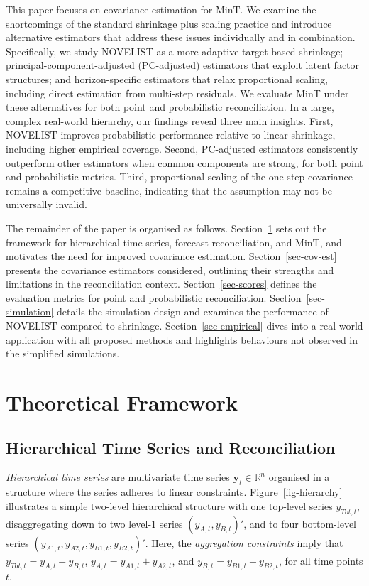 \documentclass[
  11pt,
  letterpaper,
  DIV=11,
  numbers=noendperiod,
  titlepage]{scrartcl}
\begin{document}
This paper focuses on covariance estimation for MinT. We examine the
shortcomings of the standard shrinkage plus scaling practice and
introduce alternative estimators that address these issues individually
and in combination. Specifically, we study NOVELIST as a more adaptive
target-based shrinkage; principal-component-adjusted (PC-adjusted)
estimators that exploit latent factor structures; and horizon-specific
estimators that relax proportional scaling, including direct estimation
from multi-step residuals. We evaluate MinT under these alternatives for
both point and probabilistic reconciliation. In a large, complex
real-world hierarchy, our findings reveal three main insights. First,
NOVELIST improves probabilistic performance relative to linear
shrinkage, including higher empirical coverage. Second, PC-adjusted
estimators consistently outperform other estimators when common
components are strong, for both point and probabilistic metrics. Third,
proportional scaling of the one-step covariance remains a competitive
baseline, indicating that the assumption may not be universally invalid.

The remainder of the paper is organised as follows.
Section~\ref{sec-pre-theory} sets out the framework for hierarchical
time series, forecast reconciliation, and MinT, and motivates the need
for improved covariance estimation. Section~\ref{sec-cov-est} presents
the covariance estimators considered, outlining their strengths and
limitations in the reconciliation context. Section~\ref{sec-scores}
defines the evaluation metrics for point and probabilistic
reconciliation. Section~\ref{sec-simulation} details the simulation
design and examines the performance of NOVELIST compared to shrinkage.
Section~\ref{sec-empirical} dives into a real-world application with all
proposed methods and highlights behaviours not observed in the
simplified simulations.

\section{Theoretical Framework}\label{sec-pre-theory}

\subsection{Hierarchical Time Series and
Reconciliation}\label{sec-hierarchy}

\emph{Hierarchical time series} are multivariate time series
\(\boldsymbol{y}_t \in \mathbb{R}^n\) organised in a structure where the
series adheres to linear constraints. Figure~\ref{fig-hierarchy}
illustrates a simple two-level hierarchical structure with one top-level
series \(y_{Tot,t}\), disaggregating down to two level-1 series
\((y_{A,t}, y_{B,t})'\), and to four bottom-level series
\((y_{A1,t}, y_{A2,t}, y_{B1,t}, y_{B2,t})'\). Here, the
\emph{aggregation constraints} imply that
\(y_{Tot,t} = y_{A,t} + y_{B,t}\), \(y_{A,t} = y_{A1,t} + y_{A2,t}\),
and \(y_{B,t} = y_{B1,t} + y_{B2,t}\), for all time points \(t\).
\end{document}

